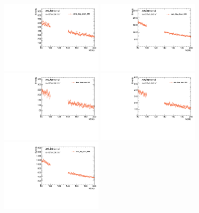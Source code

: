 \begin{figure}[htbp]
  \centering
 \includegraphics[width=0.45\textwidth]{figures/VBF/Mbb_SRI_2cen.pdf}
 \includegraphics[width=0.45\textwidth]{figures/VBF/Mbb_SRII_2cen.pdf}\\
 \includegraphics[width=0.45\textwidth]{figures/VBF/Mbb_SRI_4cen.pdf}
 \includegraphics[width=0.45\textwidth]{figures/VBF/Mbb_SRII_4cen.pdf}\\
 \includegraphics[width=0.45\textwidth]{figures/VBF/Mbb_SRIII_4cen.pdf}

\end{figure}
